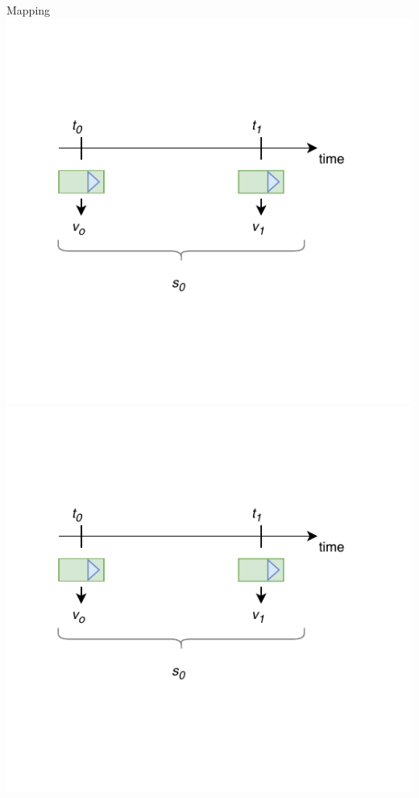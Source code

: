 \documentclass{beamer}
\begin{document}
\begin{frame}{Mapping}
\centering
\includegraphics[page=9,scale=0.55]{sources/Rounting_1.pdf}
\includegraphics[page=10,scale=0.55]{sources/Rounting_1.pdf}
\end{frame}
\end{document}
